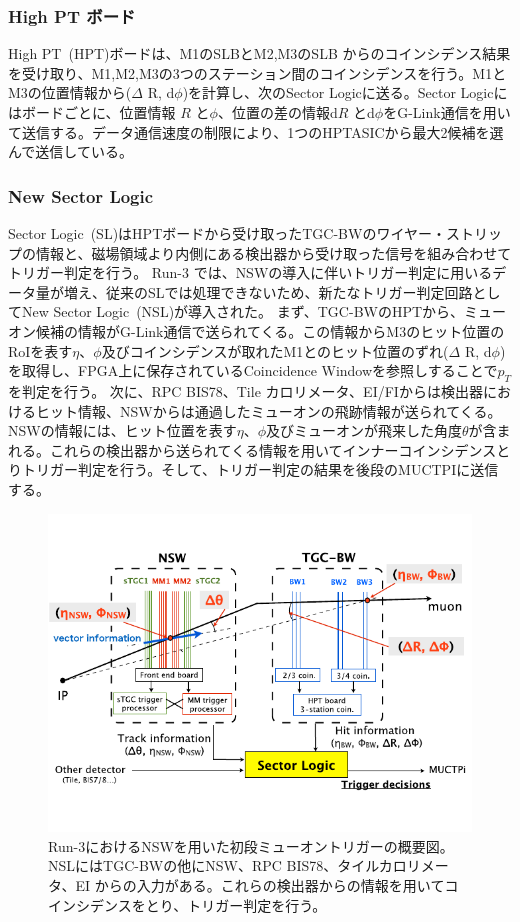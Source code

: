 \subsubsection{High PT ボード}
High PT~(HPT)ボードは、M1のSLBとM2,M3のSLB からのコインシデンス結果を受け取り、M1,M2,M3の3つのステーション間のコインシデンスを行う。M1とM3の位置情報から($\Delta$ R, d$\phi$)を計算し、次のSector Logicに送る。Sector Logicにはボードごとに、位置情報 $R$ と$\phi$、位置の差の情報d$R$ とd$\phi$をG-Link通信を用いて送信する。データ通信速度の制限により、1つのHPTASICから最大2候補を選んで送信している。

\subsubsection{New Sector Logic}
Sector Logic~(SL)はHPTボードから受け取ったTGC-BWのワイヤー・ストリップの情報と、磁場領域より内側にある検出器から受け取った信号を組み合わせてトリガー判定を行う。
Run-3 では、NSWの導入に伴いトリガー判定に用いるデータ量が増え、従来のSLでは処理できないため、新たなトリガー判定回路としてNew Sector Logic~(NSL)が導入された。
まず、TGC-BWのHPTから、ミューオン候補の情報がG-Link通信で送られてくる。この情報からM3のヒット位置のRoIを表す$\eta$、$\phi$及びコインシデンスが取れたM1とのヒット位置のずれ($\Delta$ R, d$\phi$)を取得し、FPGA上に保存されているCoincidence Windowを参照しすることで$p_T$を判定を行う。
次に、RPC BIS78、Tile カロリメータ、EI/FIからは検出器におけるヒット情報、NSWからは通過したミューオンの飛跡情報が送られてくる。NSWの情報には、ヒット位置を表す$\eta$、$\phi$及びミューオンが飛来した角度$\theta$が含まれる。これらの検出器から送られてくる情報を用いてインナーコインシデンスとりトリガー判定を行う。そして、トリガー判定の結果を後段のMUCTPIに送信する。

\begin{figure}[tb]
  \centering
  \includegraphics[clip, width=14cm]{fig/2/NSW_innercoin.pdf}
  \caption{Run-3におけるNSWを用いた初段ミューオントリガーの概要図\cite{article:akatsuka-mron}。NSLにはTGC-BWの他にNSW、RPC BIS78、タイルカロリメータ、EI からの入力がある。これらの検出器からの情報を用いてコインシデンスをとり、トリガー判定を行う。}
  \label{fig:NSW_inner}
\end{figure}


